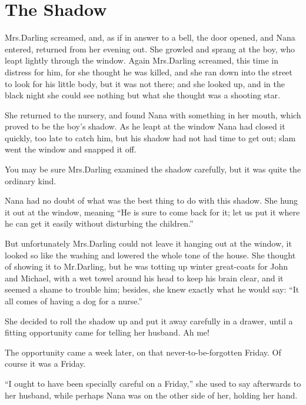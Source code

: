 
\chapter{The Shadow}

Mrs.\@ Darling screamed,
and, as if in answer to a bell, the door opened,
and Nana entered, returned from her evening out.
She growled and sprang at the boy, who leapt lightly through the window.
Again Mrs.\@ Darling screamed, this time in distress for him, for she thought he was killed,
and she ran down into the street to look for his little body, but it was not there;
and she looked up, and in the black night she could see nothing but what she thought was a shooting star.

She returned to the nursery,
and found Nana with something in her mouth, which proved to be the boy’s shadow.
As he leapt at the window Nana had closed it quickly, too late to catch him,
but his shadow had not had time to get out;
slam went the window and snapped it off.

You may be sure Mrs.\@ Darling examined the shadow carefully,
but it was quite the ordinary kind.

Nana had no doubt of what was the best thing to do with this shadow.
She hung it out at the window, meaning “He is sure to come back for it;
let us put it where he can get it easily without disturbing the children.”

But unfortunately Mrs.\@ Darling could not leave it hanging out at the window,
it looked so like the washing and lowered the whole tone of the house.
She thought of showing it to Mr.\@ Darling,
but he was totting up winter great-coats for John and Michael,
with a wet towel around his head to keep his brain clear, and it seemed a shame to trouble him;
besides, she knew exactly what he would say:
“It all comes of having a dog for a nurse.”

She decided to roll the shadow up and put it away carefully in a drawer,
until a fitting opportunity came for telling her husband.
Ah me!

The opportunity came a week later, on that never-to-be-forgotten Friday.
Of course it was a Friday.

“I ought to have been specially careful on a Friday,” she used to say afterwards to her husband,
while perhaps Nana was on the other side of her, holding her hand.

